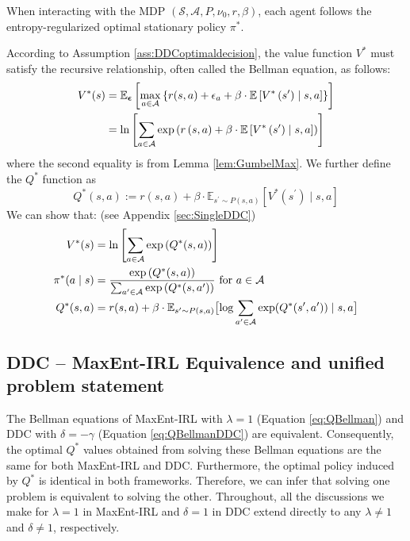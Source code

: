 \begin{asmp}\label{ass:DDCoptimaldecision} When interacting with the MDP $\left(\mathcal{S}, \mathcal{A}, P, \nu_0, r, \beta\right)$, each agent follows the entropy-regularized optimal stationary policy $\pi^*$.
\end{asmp}
According to Assumption \ref{ass:DDCoptimaldecision}, the value function $V^\ast$ must satisfy the recursive relationship, often called the Bellman equation, as follows:
\begin{align}
V^\ast(s)&=\mathbb{E}_{\boldsymbol{\epsilon}}\left[\max _{a \in \mathcal{A}}\left\{r(s, a)+\epsilon_a+\beta \cdot \mathbb{E}\left[V^\ast\left(s^{\prime}\right) \mid s, a\right]\right\}\right] \notag
\\
&=\ln \left[\sum_{a\in \mathcal{A}}\exp\left(r\left(s, a\right)+\beta \cdot \mathbb{E}\left[V^\ast\left(s^\prime\right)\mid s, a\right]\right)\right]  \notag
\end{align}
where the second equality is from Lemma \ref{lem:GumbelMax}.
We further define the $Q^\ast$ function as
$$
Q^*(s, a):=r(s, a)+\beta \cdot \mathbb{E}_{s^{\prime} \sim P(s, a)}\left[V^*\left(s^{\prime}\right) \mid s, a\right]
$$
We can show that: (see Appendix \ref{sec:SingleDDC}) 
\begin{align}
    V^*(s)&=\ln \left[\sum_{a\in \mathcal{A}}\exp\left(Q^*(s, a)\right)\right] \notag
    \\
    \pi^*(a\mid s) &= \frac{\exp \left({Q^*(s, a)}\right)}{\sum_{a^\prime\in \mathcal{A}} \exp \left({Q^*(s, a^\prime)}\right)} \text{ for } a\in \mathcal{A} \notag
    \\
      Q^*(s,a) &=r(s, a)+\beta \cdot \mathbb{E}_{s^\prime \sim P(s, a)}    \bigl[\log\sum_{a^\prime\in\mathcal{A}}\exp(Q^*(s^\prime,a^\prime)) \mid s, a\bigr]\label{eq:QBellmanDDC}
\end{align}

\subsection{DDC -- MaxEnt-IRL Equivalence and unified problem statement}
The Bellman equations of MaxEnt-IRL with \(\lambda = 1\) (Equation \ref{eq:QBellman}) and DDC with \(\delta = -\gamma\) (Equation \ref{eq:QBellmanDDC}) are equivalent. Consequently, the optimal \(Q^*\) values obtained from solving these Bellman equations are the same for both MaxEnt-IRL and DDC. Furthermore, the optimal policy induced by \(Q^*\) is identical in both frameworks. Therefore, we can infer that solving one problem is equivalent to solving the other. Throughout, all the discussions we make for \(\lambda = 1\) in MaxEnt-IRL and \(\delta = 1\) in DDC extend directly to any \(\lambda \neq 1\) and \(\delta \neq 1\), respectively.


